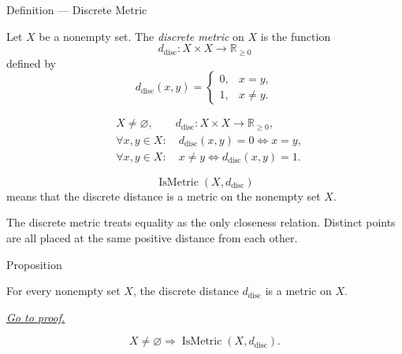 \begin{definitionbox}{Definition --- Discrete Metric}
\begin{definition}\label{def:discrete-metric}
Let \(X\) be a nonempty set.  The \emph{discrete metric} on \(X\) is the
function
\[
  d_{\mathrm{disc}}:X\times X\to\mathbb{R}_{\geq 0}
\]
defined by
\[
  d_{\mathrm{disc}}(x,y)
  =
  \begin{cases}
    0, & x=y,\\
    1, & x\neq y.
  \end{cases}
\]
\end{definition}
\end{definitionbox}

\begin{remark*}
\[
\begin{aligned}
&X\neq\varnothing,\qquad
d_{\mathrm{disc}}:X\times X\to\mathbb{R}_{\geq 0},\\
&\forall x,y\in X{:}\quad
d_{\mathrm{disc}}(x,y)=0 \Longleftrightarrow x=y,\\
&\forall x,y\in X{:}\quad
x\neq y \Longleftrightarrow d_{\mathrm{disc}}(x,y)=1.
\end{aligned}
\]
\end{remark*}

\begin{remark*}
\[
\operatorname{IsMetric}(X,d_{\mathrm{disc}})
\]
means that the discrete distance is a metric on the nonempty set \(X\).
\end{remark*}

\begin{remark*}[Interpretation]
The discrete metric treats equality as the only closeness relation.  Distinct
points are all placed at the same positive distance from each other.
\end{remark*}

\DefinitionalRoot

\begin{propositionbox}{Proposition}
\begin{proposition}
\label{prop:discrete-metric-space}
For every nonempty set \(X\), the discrete distance
\(d_{\mathrm{disc}}\) is a metric on \(X\).

\smallskip
\noindent
\hyperref[prf:discrete-metric-space]{\textit{Go to proof.}}
\end{proposition}
\end{propositionbox}

\begin{remark*}
\[
X\neq\varnothing
\Longrightarrow
\operatorname{IsMetric}(X,d_{\mathrm{disc}}).
\]
\end{remark*}

